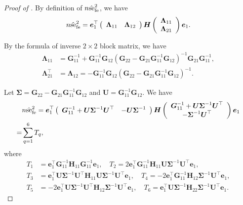 \documentclass[12pt]{article}
\newcommand{\se}{\textnormal{se}}
\newcommand{\fe}{\textnormal{fe}}
\newcommand{\bs}{\boldsymbol}
\begin{document}
\begin{proof}[Proof of ]
By definition of $n\hat{\se}^2_{\fe}$, we have
\[
n\hat{\se}^2_{\fe } = \bs{e}_1^\top\left(\begin{array}{cc}
      \bs{\Lambda}_{11}  &  \bs{\Lambda}_{12}
\end{array}\right)\bs{H}\left(\begin{array}{c}
      \bs{\Lambda}_{11} \\ 
      \bs{\Lambda}_{21}
    \end{array}\right)\bs{e}_1.
\]

By the formula of inverse $2\times 2$ block matrix, we have
\begin{align*}
    \bs{\Lambda}_{11} &= \bs{G}_{11}^{-1}+ \bs{G}_{11}^{-1} \bs{G}_{12} (\bs{G}_{22}-\bs{G}_{21}\bs{G}_{11}^{-1}\bs{G}_{12})^{-1}\bs{G}_{21}\bs{G}_{11}^{-1},\\
    \bs{\Lambda}_{21}^\top &= \bs{\Lambda}_{12} = -\bs{G}_{11}^{-1}\bs{G}_{12}(\bs{G}_{22}-\bs{G}_{21}\bs{G}_{11}^{-1}\bs{G}_{12})^{-1}.
\end{align*}

Let $\bs{\Sigma} = \bs{G}_{22}- \bs{G}_{21}\bs{G}_{11}^{-1}\bs{G}_{12}$ and $\bs{U}= \bs{G}_{11}^{-1}\bs{G}_{12}$. We have
\begin{align*}
    & n\hat{\se}^2_{\fe } = \bs{e}_1^\top\left(\begin{array}{cc}
      \bs{G}_{11}^{-1} + \bs{U}\bs{\Sigma}^{-1} \bs{U}^\top  &  -\bs{U}\bs{\Sigma}^{-1}
    \end{array}\right)\bs{H}\left(\begin{array}{c}
      \bs{G}_{11}^{-1} + \bs{U}\bs{\Sigma}^{-1}\bs{U}^\top  \\ 
      -\bs{\Sigma}^{-1}\bs{U}^\top
    \end{array}\right)\bs{e}_1\\
    =& \sum_{q=1}^6 T_q,
\end{align*}
where
\begin{align*}
    T_1 &= \bs{e}_1^\top  \bs{G}_{11}^{-1} \bs{H}_{11}  \bs{G}_{11}^{-1} \bs{e}_1,\quad T_2 = 2\bs{e}_1^\top  \bs{G}_{11}^{-1} \bs{H}_{11}  \bs{U}\bs{\Sigma}^{-1}\bs{U}^\top \bs{e}_1,\\
    T_3 &= \bs{e}_1^\top  \bs{U}\bs{\Sigma}^{-1}\bs{U}^\top \bs{H}_{11}  \bs{U}\bs{\Sigma}^{-1}\bs{U}^\top \bs{e}_1,\quad T_4=-2\bs{e}_1^\top  \bs{G}_{11}^{-1} \bs{H}_{12}  \bs{\Sigma}^{-1}\bs{U}^\top \bs{e}_1,\\
    T_5 &= -2\bs{e}_1^\top  \bs{U}\bs{\Sigma}^{-1}\bs{U}^\top \bs{H}_{12}  \bs{\Sigma}^{-1}\bs{U}^\top  \bs{e}_1,\quad  T_6 = \bs{e}_1^\top  \bs{U}\bs{\Sigma}^{-1} \bs{H}_{22}  \bs{\Sigma}^{-1}\bs{U}^\top  \bs{e}_1.
\end{align*}


\end{proof}
\end{document}
